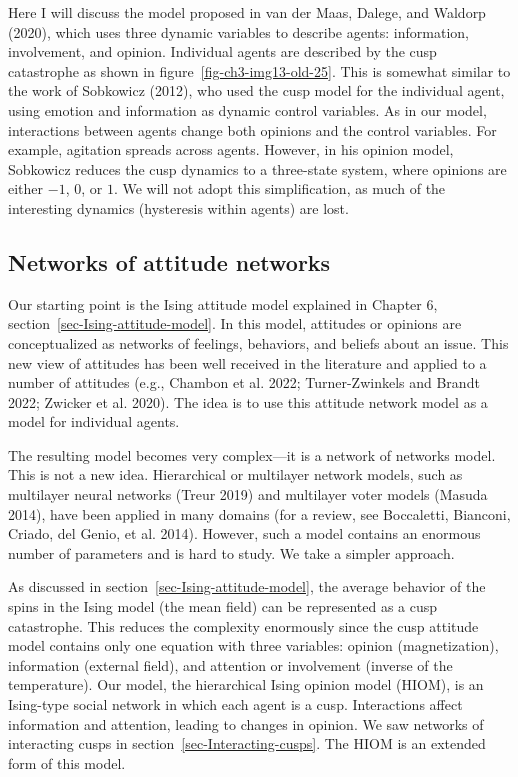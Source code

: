 \documentclass[
  a4paper,
  DIV=11,
  numbers=noendperiod,
  oneside]{scrreprt}
\begin{document}
Here I will discuss the model proposed in van der Maas, Dalege, and
Waldorp (2020), which uses three dynamic variables to describe agents:
information, involvement, and opinion. Individual agents are described
by the cusp catastrophe as shown in figure~\ref{fig-ch3-img13-old-25}.
This is somewhat similar to the work of Sobkowicz (2012), who used the
cusp model for the individual agent, using emotion and information as
dynamic control variables. As in our model, interactions between agents
change both opinions and the control variables. For example, agitation
spreads across agents. However, in his opinion model, Sobkowicz reduces
the cusp dynamics to a three-state system, where opinions are either
\(-1\), \(0\), or \(1\). We will not adopt this simplification, as much
of the interesting dynamics (hysteresis within agents) are lost.

\subsection{Networks of attitude
networks}\label{sec-Networks-of-attitude-networks}

Our starting point is the Ising attitude model explained in Chapter 6,
section~\ref{sec-Ising-attitude-model}. In this model, attitudes or
opinions are conceptualized as networks of feelings, behaviors, and
beliefs about an issue. This new view of attitudes has been well
received in the literature and applied to a number of attitudes (e.g.,
Chambon et al. 2022; Turner-Zwinkels and Brandt 2022; Zwicker et al.
2020). The idea is to use this attitude network model as a model for
individual agents.

The resulting model becomes very complex---it is a network of networks
model. This is not a new idea. Hierarchical or multilayer network
models, such as multilayer neural networks (Treur 2019) and multilayer
voter models (Masuda 2014), have been applied in many domains (for a
review, see Boccaletti, Bianconi, Criado, del Genio, et al. 2014).
However, such a model contains an enormous number of parameters and is
hard to study. We take a simpler approach.

As discussed in section~\ref{sec-Ising-attitude-model}, the average
behavior of the spins in the Ising model (the mean field) can be
represented as a cusp catastrophe. This reduces the complexity
enormously since the cusp attitude model contains only one equation with
three variables: opinion (magnetization), information (external field),
and attention or involvement (inverse of the temperature). Our model,
the hierarchical Ising opinion model (HIOM), is an Ising-type social
network in which each agent is a cusp. Interactions affect information
and attention, leading to changes in opinion. We saw networks of
interacting cusps in section~\ref{sec-Interacting-cusps}. The HIOM is an
extended form of this model.
\end{document}
